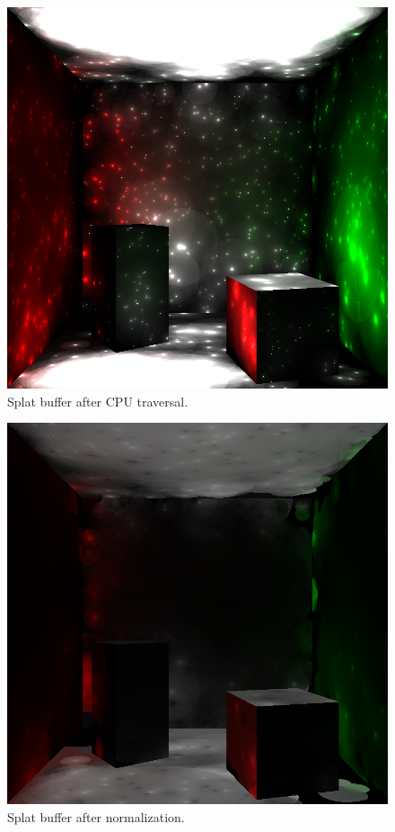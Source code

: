 \documentclass[10pt,twopage]{acmsiggraph}
\begin{document}
\begin{figure}[htbp]
\begin{center}
\includegraphics[scale = .3]{firstBounceLight.png}
\caption{Splat buffer after CPU traversal.}
\label{splatAll}
\end{center}
\end{figure}

\begin{figure}[htbp]
\begin{center}
\includegraphics[scale = .3]{indirectContribution.png}
\caption{Splat buffer after normalization.}
\label{splatNorm}
\end{center}
\end{figure}
\end{document}
